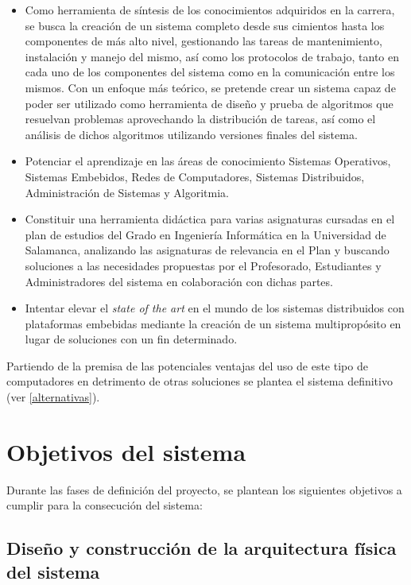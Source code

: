 \begin{itemize}
	\item Como herramienta de síntesis de los conocimientos adquiridos en la carrera, se busca la creación de un sistema completo desde sus cimientos hasta los componentes de más alto nivel, gestionando las tareas de mantenimiento, instalación y manejo del mismo, así como los protocolos de trabajo, tanto en cada uno de los componentes del sistema como en la comunicación entre los mismos. Con un enfoque más teórico, se pretende crear un sistema capaz de poder ser utilizado como herramienta de diseño y prueba de algoritmos que resuelvan problemas aprovechando la distribución de tareas, así como el análisis de dichos algoritmos utilizando versiones finales del sistema.

	\item Potenciar el aprendizaje en las áreas de conocimiento Sistemas Operativos, Sistemas Embebidos, Redes de Computadores, Sistemas Distribuidos, Administración de Sistemas y Algoritmia.
	
	\item Constituir una herramienta didáctica para varias asignaturas cursadas en el plan de estudios del Grado en Ingeniería Informática en la Universidad de Salamanca, analizando las asignaturas de relevancia en el Plan y buscando soluciones a las necesidades propuestas por el Profesorado, Estudiantes y Administradores del sistema en colaboración con dichas partes.

	\item Intentar elevar el \textit{state of the art} en el mundo de los sistemas distribuidos con plataformas embebidas mediante la creación de un sistema multipropósito en lugar de soluciones con un fin determinado.

\end{itemize}

Partiendo de la premisa de las potenciales ventajas del uso de este tipo de computadores en detrimento de otras soluciones se plantea el sistema definitivo (ver \ref{alternativas}).

\section{Objetivos del sistema}

Durante las fases de definición del proyecto, se plantean los siguientes objetivos a cumplir para la consecución del sistema:

\subsection{Diseño y construcción de la arquitectura física del sistema}

